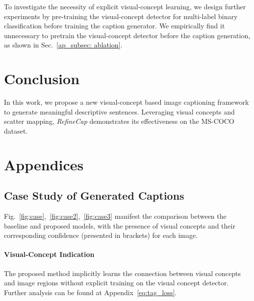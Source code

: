 \documentclass[11pt]{article}
\begin{document}
To investigate the necessity of explicit visual-concept learning, we design further experiments by pre-training the visual-concept detector for multi-label binary classification before training the caption generator. We empirically find it unnecessary to pretrain the visual-concept detector before the caption generation, as shown in Sec.~\ref{ap_subsec: ablation}.








\section{Conclusion}
In this work, we propose a new visual-concept based image captioning framework to generate meaningful descriptive sentences. Leveraging visual concepts and scatter mapping, \emph{RefineCap} demonstrates its effectiveness on the MS-COCO dataset. 










\clearpage
\appendix
\section{Appendices}
\label{sec:appendix}

\subsection{Case Study of Generated Captions}
\label{ap_subsec: cases}
Fig.~\ref{fig:case},~\ref{fig:case2},~\ref{fig:case3} manifest the comparison between the baseline and proposed models, with the presence of visual concepts and their corresponding confidence (presented in brackets) for each image. 

\paragraph{Visual-Concept Indication} The proposed method implicitly learns the connection between visual concepts and image regions without explicit training on the visual concept detector. Further analysis can be found at Appendix~\ref{eq:tag_loss}.
\end{document}
